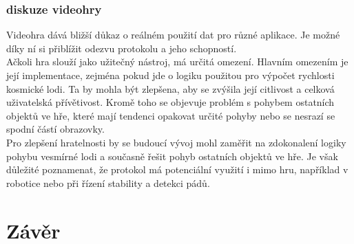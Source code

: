 \documentclass[12pt]{report}			%
\begin{document}
\subsection{diskuze videohry}

Videohra dává bližší důkaz o reálném použití dat pro různé aplikace. Je možné díky ní si přiblížit odezvu protokolu a jeho schopností. 
\\
Ačkoli hra slouží jako užitečný nástroj, má určitá omezení. Hlavním omezením je její implementace, zejména pokud jde o logiku použitou pro výpočet rychlosti kosmické lodi. Ta by mohla být zlepšena, aby se zvýšila její citlivost a celková uživatelská přívětivost. Kromě toho se objevuje problém s pohybem ostatních objektů ve hře, které mají tendenci opakovat určité pohyby nebo se nesrazí se spodní částí obrazovky.
\\
Pro zlepšení hratelnosti by se budoucí vývoj mohl zaměřit na zdokonalení logiky pohybu vesmírné lodi a současně řešit pohyb ostatních objektů ve hře. Je však důležité poznamenat, že protokol má potenciální využití i mimo hru, například v robotice nebo při řízení stability a detekci pádů.



	\chapter*{Závěr}
	
		\lipsum[1]
	
	\nocite{*}
    	\printbibliography					
    \printglossary[title={Zkratky}]		
    \listoffigures					
    \listoftables						
\end{document}
